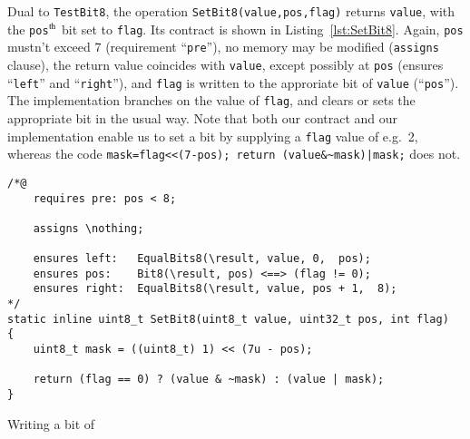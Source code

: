 Dual to \lstinline{TestBit8}, the operation \lstinline{SetBit8(value,pos,flag)}
returns \lstinline{value}, with the \lstinline{pos}$^{\mbox{\scriptsize th}}$ bit
set to \lstinline{flag}.
%
Its contract is shown in Listing~\ref{lst:SetBit8}.
%
Again, \lstinline{pos} mustn't exceed 7 (requirement ``\lstinline{pre}''),
no memory may be modified (\lstinline{assigns} clause),
the return value coincides with \lstinline{value}, except possibly at \lstinline{pos}
(ensures ``\lstinline{left}'' and ``\lstinline{right}''),
and \lstinline{flag} is written to the approriate bit of \lstinline{value}
(``\lstinline{pos}'').
%
The implementation branches on the value of \lstinline{flag}, and clears or sets the
appropriate bit in the usual way.
%
Note that both our contract and our implementation enable us to set a bit by supplying a
\lstinline{flag} value of e.g.\ 2, whereas the code 
\lstinline{mask=flag<<(7-pos); return (value&~mask)|mask;} does not.





\begin{listing}[hbt]
\begin{minipage}{0.99\textwidth}
\begin{lstlisting}[style=acsl-block]
/*@
    requires pre: pos < 8;

    assigns \nothing;

    ensures left:   EqualBits8(\result, value, 0,  pos);
    ensures pos:    Bit8(\result, pos) <==> (flag != 0);
    ensures right:  EqualBits8(\result, value, pos + 1,  8);
*/
static inline uint8_t SetBit8(uint8_t value, uint32_t pos, int flag)
{
    uint8_t mask = ((uint8_t) 1) << (7u - pos);

    return (flag == 0) ? (value & ~mask) : (value | mask);
}
\end{lstlisting}
\end{minipage}
\caption{\label{lst:SetBit8}Writing a bit of }
\end{listing}























\FloatBarrier

